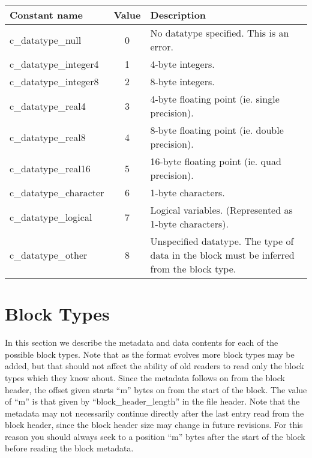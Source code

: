 \documentclass[12pt]{article}
\newcommand{\subsec}{\section}
\begin{document}
\begin{center}
\begin{tabularx}{0.9\textwidth}[!hbt]{lcX}
  Constant name & Value & Description
  \\\toprule

  c\_datatype\_null & 0 & No datatype specified. This is an error.
  \\\midrule

  c\_datatype\_integer4 & 1 & 4-byte integers.
  \\\midrule

  c\_datatype\_integer8 & 2 & 8-byte integers.
  \\\midrule

  c\_datatype\_real4 & 3 & 4-byte floating point (ie. single precision).
  \\\midrule

  c\_datatype\_real8 & 4 & 8-byte floating point (ie. double precision).
  \\\midrule

  c\_datatype\_real16 & 5 & 16-byte floating point (ie. quad precision).
  \\\midrule

  c\_datatype\_character & 6 & 1-byte characters.
  \\\midrule

  c\_datatype\_logical & 7 & Logical variables. (Represented as 1-byte
  characters).
  \\\midrule

  c\_datatype\_other & 8 & Unspecified datatype. The type of data in the block
  must be inferred from the block type.
\end{tabularx}
\end{center}\vspace{10pt}

\subsec{Block Types}

In this section we describe the metadata and data contents for each of
the possible block types. Note that as the format evolves more block types
may be added, but that should not affect the ability of old readers to
read only the block types which they know about.
Since the metadata follows on from the block header, the offset given
starts ``m'' bytes on from the start of the block. The value of ``m''
is that given by ``block\_header\_length'' in the file header. Note that
the metadata may not necessarily continue directly after the last entry
read from the block header, since the block header size may change in
future revisions. For this reason you should always seek to a position
``m'' bytes after the start of the block before reading the block metadata.
\end{document}
